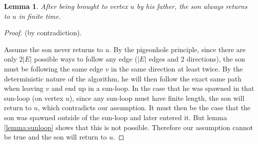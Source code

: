 \documentclass{article}
\newtheorem{lemma}{Lemma}
\begin{document}
\begin{lemma}\label{lemma:finite}
After being brought to vertex $u$ by his father, the son always returns to $u$ in finite time.
\end{lemma}
\begin{proof} (by contradiction).

Assume the son never returns to $u$. By the pigeonhole principle, since there are only $2|E|$ possible ways to follow any edge ($|E|$ edges and 2 directions), the son must be following the same edge $v$ in the same direction at least twice. By the deterministic nature of the algorithm, he will then follow the exact same path when leaving $v$ and end up in a sun-loop. In the case that he was spawned in that sun-loop (on vertex $u$), since any sun-loop must have finite length, the son will return to $u$, which contradicts our assumption. It must then be the case that the son was spawned outside of the sun-loop and later entered it. But lemma \ref{lemma:sunloop} shows that this is not possible. Therefore our assumption cannot be true and the son will return to $u$.
\end{proof}
\end{document}
